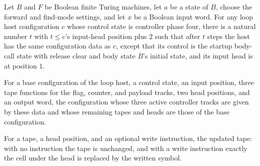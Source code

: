 \begin{lemma}
\label{Turing.FinTM.loopHost_input_rewind}
\leanok
{}
Let $B$ and $F$ be Boolean finite Turing machines, let $a$ be a state of $B$, choose the
forward and find-mode settings, and let $x$ be a Boolean input word. For any loop host
configuration $c$ whose control state is controller phase four, there is a natural
number $t$ with $t\le c$'s input-head position plus $2$ such that after $t$ steps the
host has the same configuration data as $c$, except that its control is the startup
body-call state with release clear and body state $B$'s initial state, and its input
head is at position $1$.
\end{lemma}

\begin{definition}
\label{Turing.FinTM.loopFrame}
\leanok
{}
For a base configuration of the loop host, a control state, an input position, three
tape functions for the flag, counter, and payload tracks, two head positions, and an
output word, the configuration whose three active controller tracks are given by these
data and whose remaining tapes and heads are those of the base configuration.
\end{definition}

\begin{definition}
\label{Turing.FinTM.loopWrite}
\leanok
For a tape, a head position, and an optional write instruction, the updated tape: with
no instruction the tape is unchanged, and with a write instruction exactly the cell
under the head is replaced by the written symbol.
\end{definition}

